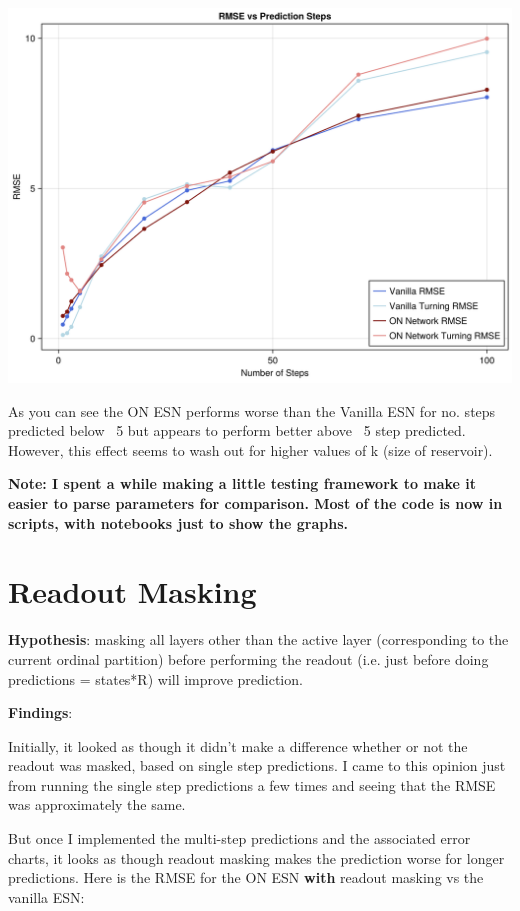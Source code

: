 \documentclass[a4paper,12pt]{article}
\begin{document}
\includegraphics[width=\textwidth]{figure_8.png}


As you can see the ON ESN performs worse than the Vanilla ESN for no. steps predicted below ~5 but appears to perform better above ~5 step predicted. However, this effect seems to wash out for higher values of k (size of reservoir).



\textbf{Note: I spent a while making a little testing framework to make it easier to parse parameters for comparison. Most of the code is now in scripts, with notebooks just to show the graphs.}



\section{Readout Masking}

\textbf{Hypothesis}: masking all layers other than the active layer (corresponding to the current ordinal partition) before performing the readout (i.e. just before doing predictions = states*R) will improve prediction.

\textbf{Findings}:

Initially, it looked as though it didn't make a difference whether or not the readout was masked, based on single step predictions. I came to this opinion just from running the single step predictions a few times and seeing that the RMSE was approximately the same.

But once I implemented the multi-step predictions and the associated error charts, it looks as though readout masking makes the prediction worse for longer predictions. Here is the RMSE for the ON ESN \textbf{with} readout masking vs the vanilla ESN:
\end{document}
